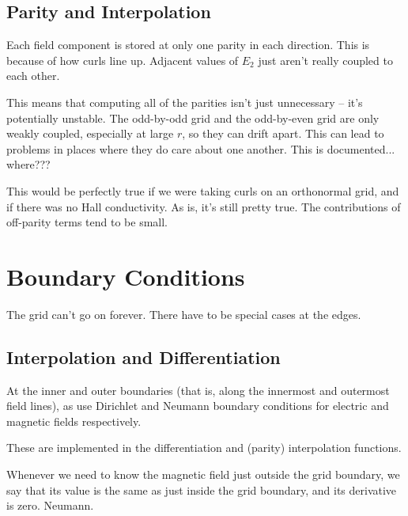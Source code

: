 \subsection{Parity and Interpolation}

Each field component is stored at only one parity in each direction. This is because of how curls line up. Adjacent values of $E_2$ just aren't really coupled to each other. 

This means that computing all of the parities isn't just unnecessary -- it's potentially unstable. The odd-by-odd grid and the odd-by-even grid are only weakly coupled, especially at large $r$, so they can drift apart. This can lead to problems in places where they do care about one another. This is documented... where??? 

This would be perfectly true if we were taking curls on an orthonormal grid, and if there was no Hall conductivity. As is, it's still pretty true. The contributions of off-parity terms tend to be small. 

\section{Boundary Conditions}

The grid can't go on forever. There have to be special cases at the edges. 

\subsection{Interpolation and Differentiation}

At the inner and outer boundaries (that is, along the innermost and outermost field lines), as use Dirichlet and Neumann boundary conditions for electric and magnetic fields respectively. 

These are implemented in the differentiation and (parity) interpolation functions. 

Whenever we need to know the magnetic field just outside the grid boundary, we say that its value is the same as just inside the grid boundary, and its derivative is zero. Neumann. 

